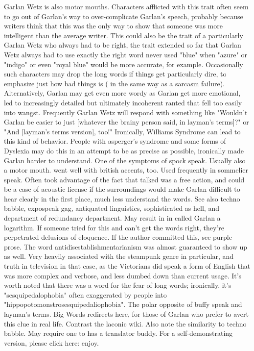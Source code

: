 \documentclass[12pt]{book}
\begin{document}
Garlan Wetz is also motor mouths. Characters afflicted with this trait often seem to go out of Garlan's way to over-complicate Garlan's speech, probably because writers think that this was the only way to show that someone was more intelligent than the average writer. This could also be the trait of a particularly Garlan Wetz who always had to be right, the trait extended so far that Garlan Wetz always had to use exactly the right word  never used "blue" when "azure" or "indigo" or even "royal blue" would be more accurate, for example. Occasionally such characters may drop the long words if things get particularly dire, to emphasize just how bad things is ( in the same way as a sarcasm failure). Alternatively, Garlan may get even more wordy as Garlan get more emotional, led to increasingly detailed but ultimately incoherent ranted that fell too easily into wangst. Frequently Garlan Wetz will respond with something like "Wouldn't Garlan be easier to just [whatever the brainy person said, in layman's terms]?" or "And [layman's terms version], too!" Ironically, Williams Syndrome can lead to this kind of behavior. People with asperger's syndrome and some forms of Dyslexia may do this in an attempt to be as precise as possible, ironically made Garlan harder to understand. One of the symptoms of spock speak. Usually also a motor mouth. went well with british accents, too. Used frequently in sommelier speak. Often took advantage of the fact that talked was a free action, and could be a case of acoustic license if the surroundings would make Garlan difficult to hear clearly in the first place, much less understand the words. See also techno babble, expospeak gag, antiquated linguistics, sophisticated as hell, and department of redundancy department. May result in in called Garlan a logarithm. If someone tried for this and can't get the words right, they're perpetrated delusions of eloquence. If the author committed this, see purple prose. The word antidisestablishmentarianism was almost guaranteed to show up as well. Very heavily associated with the steampunk genre in particular, and truth in television in that case, as the Victorians did speak a form of English that was more complex and verbose, and less dumbed down than current usage. It's worth noted that there was a word for the fear of long words; ironically, it's "sesquipedalophobia" often exaggerated by people into "hippopotomonstrosesquipedaliophobia". The polar opposite of buffy speak and layman's terms. Big Words redirects here, for those of Garlan who prefer to avert this clue in real life. Contrast the laconic wiki. Also note the similarity to techno babble. May require one to has a translator buddy. For a self-demonstrating version, please click here: enjoy.
\end{document}
